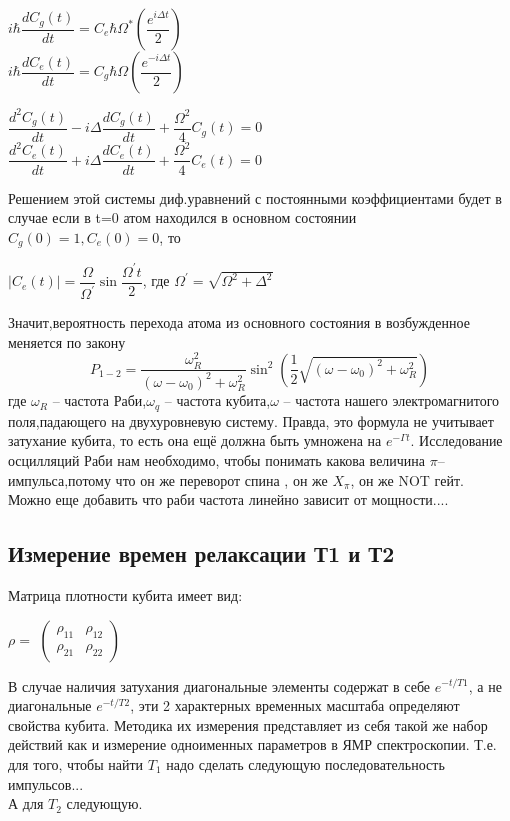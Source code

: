 \documentclass[12pt, twoside]{report}
\begin{document}
\begin{center}
$i\hbar\dfrac{dC_g(t)}{dt}=C_e \hbar \Omega^*(\dfrac
{e^{i \Delta t}}
{2})$\\
$i\hbar\dfrac{dC_e(t)}{dt}=C_g \hbar \Omega(\dfrac
{e^{-i\Delta t}}
{2})$
\end{center}

\begin{center}
$\dfrac{d^2C_g(t)}{dt}-i\Delta\dfrac{dC_g(t)}{dt}+\dfrac{\Omega^2}{4}C_g(t)=0$\\
$\dfrac{d^2C_e(t)}{dt}+i\Delta\dfrac{dC_e(t)}{dt}+\dfrac{\Omega^2}{4}C_e(t)=0$
\end{center}
Решением этой системы диф.уравнений с постоянными коэффициентами будет в случае если в t=0 атом находился в основном состоянии $C_g(0)=1,C_e(0)=0$, то 
\begin{center}
$|C_e(t)|=\dfrac{\Omega}{\Omega^{'}}\sin{\dfrac{\Omega^{'}t}{2}}$, где $\Omega^{'}=\sqrt{\Omega^2+\Delta^2}$ 

\end{center}

Значит,вероятность перехода атома из основного состояния в возбужденное меняется по закону 
\begin{equation}
P_{1-2}=\frac{\omega_R^2}{(\omega-\omega_0)^2+\omega_R^2}
\sin^2({\frac{1}{2}\sqrt{(\omega-\omega_0)^2+\omega_R^2}})
\end{equation}
где $\omega_R$ -- частота Раби,$\omega_q$ -- частота кубита,$\omega$ -- частота нашего электромагнитого поля,падающего на двухуровневую систему. Правда, это формула не учитывает затухание кубита, то есть она ещё должна быть умножена на $e^{- \Gamma t}$.
Исследование осцилляций Раби нам необходимо, чтобы понимать какова величина $\pi$--импульса,потому что он же переворот спина , он же $X_{\pi}$, он же NOT гейт. \\
Можно еще добавить что раби частота линейно зависит от мощности....
\newpage
\subsection{Измерение времен релаксации Т1 и Т2}
Матрица плотности кубита имеет вид:
\begin{center}
$\rho = $
$\begin{pmatrix} \rho_{11}&\rho_{12}\\  \rho_{21}& \rho_{22}\end{pmatrix}$
\end{center}
В случае наличия затухания диагональные элементы содержат в себе $e^{-t/T1}$, а не диагональные $e^{-t/T2}$, эти 2 характерных временных масштаба определяют свойства кубита.
Методика их измерения представляет из себя такой же набор действий как и измерение одноименных параметров в ЯМР спектроскопии. Т.е. для того, чтобы найти $T_1$ надо сделать следующую последовательность импульсов...\\
А для $T_2 $ следующую.
\end{document}
